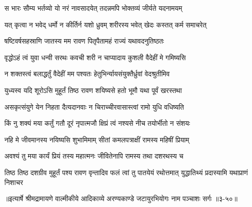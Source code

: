 \twolineshloka
{स भारः सौम्य भर्तव्यो यो नरं नावसादयेत्}
{तदन्नमपि भोक्तव्यं जीर्यते यदनामयम्} %

\twolineshloka
{यत् कृत्वा न भवेद् धर्मो न कीर्तिर्न यशो ध्रुवम्}
{शरीरस्य भवेत् खेदः कस्तत् कर्म समाचरेत्} %

\twolineshloka
{षष्टिवर्षसहस्राणि जातस्य मम रावण}
{पितृपैतामहं राज्यं यथावदनुतिष्ठतः} %

\twolineshloka
{वृद्धोऽहं त्वं युवा धन्वी सरथः कवची शरी}
{न चाप्यादाय कुशली वैदेहीं मे गमिष्यसि} %

\twolineshloka
{न शक्तस्त्वं बलाद्धर्तुं वैदेहीं मम पश्यतः}
{हेतुभिर्न्यायसंयुक्तैर्ध्रुवां वेदश्रुतीमिव} %

\twolineshloka
{युध्यस्व यदि शूरोऽसि मुहूर्तं तिष्ठ रावण}
{शयिष्यसे हतो भूमौ यथा पूर्वं खरस्तथा} %

\twolineshloka
{असकृत्संयुगे येन निहता दैत्यदानवाः}
{न चिराच्चीरवासास्त्वां रामो युधि वधिष्यति} %

\twolineshloka
{किं नु शक्यं मया कर्तुं गतौ दूरं नृपात्मजौ}
{क्षिप्रं त्वं नश्यसे नीच तयोर्भीतो न संशयः} %

\twolineshloka
{नहि मे जीवमानस्य नयिष्यसि शुभामिमाम्}
{सीतां कमलपत्राक्षीं रामस्य महिषीं प्रियाम्} %

\twolineshloka
{अवश्यं तु मया कार्यं प्रियं तस्य महात्मनः}
{जीवितेनापि रामस्य तथा दशरथस्य च} %

\threelineshloka
{तिष्ठ तिष्ठ दशग्रीव मुहूर्तं पश्य रावण}
{वृन्तादिव फलं त्वां तु पातयेयं रथोत्तमात्}
{युद्धातिथ्यं प्रदास्यामि यथाप्राणं निशाचर} %


॥इत्यार्षे श्रीमद्रामायणे वाल्मीकीये आदिकाव्ये अरण्यकाण्डे जटायुरभियोगः नाम पञ्चाशः सर्गः ॥३-५०॥
